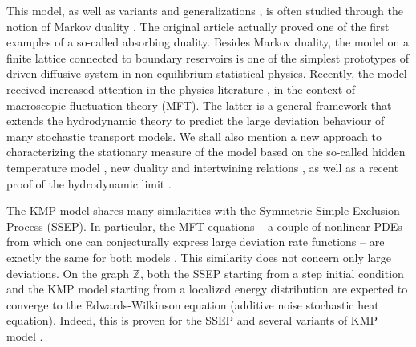 \documentclass[a4paper,11pt,oneside,reqno]{amsart}
\theoremstyle{definition}
\newcommand{\Z}{\ensuremath{\mathbb{Z}}}
\numberwithin{equation}{section}
\begin{document}
This model, as well as variants and generalizations \cite{hiddenSymetries,modelsOfTransport,carinci2016asymmetric}, is often studied through the notion of Markov duality \cite{jansen2014notion,dualityBook}. The original article \cite{kipnis1982heat} actually proved one of the first examples of a so-called absorbing duality. Besides Markov duality, the model on a finite lattice connected to boundary reservoirs is one of the simplest  prototypes of driven diffusive system in non-equilibrium statistical physics. Recently, the model received increased  attention in the physics literature \cite{bettelheim2022full,bettelheim2022inverse,grabsch2022exact,rizkallah2023duality,krajenbrink2023crossover,bettelheim2024full}, in the context of macroscopic fluctuation theory (MFT). The latter  is  a general framework \cite{bertini2002macroscopic,bertini2015macroscopic} that extends the hydrodynamic theory to  predict the large deviation behaviour of many stochastic transport models. We shall also mention a new approach to characterizing the stationary measure of the model based on the so-called hidden temperature model \cite{de2024hidden},  new duality and intertwining relations \cite{giardina2025intertwining}, as well as a recent proof of the hydrodynamic limit  \cite{franceschini2025hydrodynamic}.  
\medskip 

The KMP model shares many similarities with the Symmetric Simple Exclusion Process (SSEP). In particular, the MFT equations -- a couple of nonlinear PDEs from which one can conjecturally express large deviation rate functions -- are exactly the same for both models \cite{zarfaty2016statistics, grabsch2022exact,rizkallah2023duality}. This similarity does not concern only large deviations. On the graph $\Z$, both the SSEP starting from a step initial condition and the KMP model starting from a localized energy distribution are expected to converge to the Edwards-Wilkinson equation (additive noise stochastic heat equation). Indeed, this is proven for the SSEP  \cite{landim-book} 
and several variants of KMP model \cite{10.1214/EJP.v3-28,balazs2006random,yu2016edwards}.  
\end{document}
